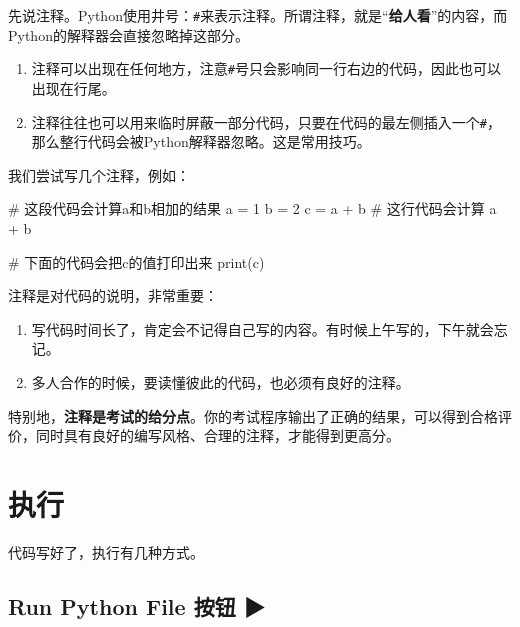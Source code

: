 \documentclass[
  letterpaper,
  DIV=11,
  numbers=noendperiod]{scrreprt}
\newenvironment{Shaded}{\begin{snugshade}}{\end{snugshade}}
\newcommand{\BuiltInTok}[1]{\textcolor[rgb]{0.00,0.23,0.31}{#1}}
\newcommand{\CommentTok}[1]{\textcolor[rgb]{0.37,0.37,0.37}{#1}}
\newcommand{\DecValTok}[1]{\textcolor[rgb]{0.68,0.00,0.00}{#1}}
\newcommand{\NormalTok}[1]{\textcolor[rgb]{0.00,0.23,0.31}{#1}}
\newcommand{\OperatorTok}[1]{\textcolor[rgb]{0.37,0.37,0.37}{#1}}
\providecommand{\tightlist}{%
  \setlength{\itemsep}{0pt}\setlength{\parskip}{0pt}}\usepackage{longtable,booktabs,array}
\begin{document}
先说注释。Python使用井号：\texttt{\#}来表示注释。所谓注释，就是``\textbf{给人看}''的内容，而Python的解释器会直接忽略掉这部分。

\begin{enumerate}
\def\labelenumi{\arabic{enumi}.}
\tightlist
\item
  注释可以出现在任何地方，注意\texttt{\#}号只会影响同一行右边的代码，因此也可以出现在行尾。
\item
  注释往往也可以用来临时屏蔽一部分代码，只要在代码的最左侧插入一个\texttt{\#}，那么整行代码会被Python解释器忽略。这是常用技巧。
\end{enumerate}

我们尝试写几个注释，例如：

\begin{Shaded}
\begin{Highlighting}[]
\CommentTok{\# 这段代码会计算a和b相加的结果}
\NormalTok{a }\OperatorTok{=} \DecValTok{1}
\NormalTok{b }\OperatorTok{=} \DecValTok{2}
\NormalTok{c }\OperatorTok{=}\NormalTok{ a }\OperatorTok{+}\NormalTok{ b }\CommentTok{\# 这行代码会计算 a + b}

\CommentTok{\# 下面的代码会把c的值打印出来}
\BuiltInTok{print}\NormalTok{(c)}
\end{Highlighting}
\end{Shaded}

注释是对代码的说明，非常重要：

\begin{enumerate}
\def\labelenumi{\arabic{enumi}.}
\tightlist
\item
  写代码时间长了，肯定会不记得自己写的内容。有时候上午写的，下午就会忘记。
\item
  多人合作的时候，要读懂彼此的代码，也必须有良好的注释。
\end{enumerate}

特别地，\textbf{注释是考试的给分点}。你的考试程序输出了正确的结果，可以得到合格评价，同时具有良好的编写风格、合理的注释，才能得到更高分。

\hypertarget{ux6267ux884c}{%
\section{执行}\label{ux6267ux884c}}

代码写好了，执行有几种方式。

\hypertarget{run-python-file-ux6309ux94ae}{%
\subsection{Run Python File 按钮 ▶}\label{run-python-file-ux6309ux94ae}}
\end{document}
